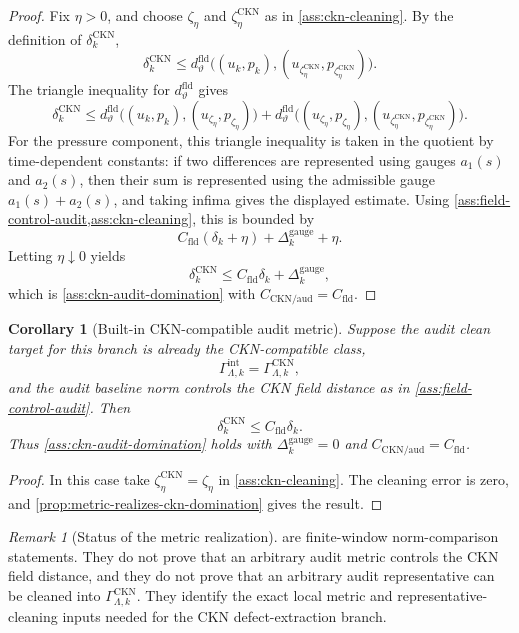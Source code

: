 \documentclass[11pt]{article}
\numberwithin{equation}{section}
\theoremstyle{plain}
\newtheorem{corollary}[theorem]{Corollary}
\theoremstyle{definition}
\theoremstyle{remark}
\newtheorem{remark}[theorem]{Remark}
\newcommand{\intg}{\mathrm{int}}
\begin{document}
\begin{proof}
Fix \(\eta>0\), and choose \(\zeta_\eta\) and
\(\zeta_\eta^{\mathrm{CKN}}\) as in \cref{ass:ckn-cleaning}.  By the
definition of \(\delta_k^{\mathrm{CKN}}\),
\[
  \delta_k^{\mathrm{CKN}}
  \le
  d_\vartheta^{\mathrm{fld}}
  \bigl((u_k,p_k),
  (u_{\zeta_\eta^{\mathrm{CKN}}},
  p_{\zeta_\eta^{\mathrm{CKN}}})\bigr).
\]
The triangle inequality for \(d_\vartheta^{\mathrm{fld}}\) gives
\[
  \delta_k^{\mathrm{CKN}}
  \le
  d_\vartheta^{\mathrm{fld}}
  \bigl((u_k,p_k),(u_{\zeta_\eta},p_{\zeta_\eta})\bigr)
  +
  d_\vartheta^{\mathrm{fld}}
  \bigl((u_{\zeta_\eta},p_{\zeta_\eta}),
  (u_{\zeta_\eta^{\mathrm{CKN}}},
  p_{\zeta_\eta^{\mathrm{CKN}}})\bigr).
\]
For the pressure component, this triangle inequality is taken in the quotient
by time-dependent constants: if two differences are represented using gauges
\(a_1(s)\) and \(a_2(s)\), then their sum is represented using the admissible
gauge \(a_1(s)+a_2(s)\), and taking infima gives the displayed estimate.
Using \cref{ass:field-control-audit,ass:ckn-cleaning}, this is bounded by
\[
  C_{\mathrm{fld}}(\delta_k+\eta)
  +
  \Delta_k^{\mathrm{gauge}}+\eta.
\]
Letting \(\eta\downarrow0\) yields
\[
  \delta_k^{\mathrm{CKN}}
  \le
  C_{\mathrm{fld}}\delta_k+\Delta_k^{\mathrm{gauge}},
\]
which is \cref{ass:ckn-audit-domination} with
\(C_{\mathrm{CKN/aud}}=C_{\mathrm{fld}}\).
\end{proof}

\begin{corollary}[Built-in CKN-compatible audit metric]
\label{cor:built-in-ckn-metric}
Suppose the audit clean target for this branch is already the
CKN-compatible class,
\[
  \Gamma_{\Lambda,k}^{\intg}=\Gamma_{\Lambda,k}^{\mathrm{CKN}},
\]
and the audit baseline norm controls the CKN field distance as in
\cref{ass:field-control-audit}.  Then
\[
  \delta_k^{\mathrm{CKN}}\le C_{\mathrm{fld}}\delta_k.
\]
Thus \cref{ass:ckn-audit-domination} holds with
\(\Delta_k^{\mathrm{gauge}}=0\) and
\(C_{\mathrm{CKN/aud}}=C_{\mathrm{fld}}\).
\end{corollary}

\begin{proof}
In this case take
\(\zeta_\eta^{\mathrm{CKN}}=\zeta_\eta\) in
\cref{ass:ckn-cleaning}.  The cleaning error is zero, and
\cref{prop:metric-realizes-ckn-domination} gives the result.
\end{proof}

\begin{remark}[Status of the metric realization]\label{rem:metric-realization-status}
 are
finite-window norm-comparison statements.  They do not prove that an arbitrary
audit metric controls the CKN field distance, and they do not prove that an
arbitrary audit representative can be cleaned into
\(\Gamma_{\Lambda,k}^{\mathrm{CKN}}\).  They identify the exact local metric
and representative-cleaning inputs needed for the CKN defect-extraction branch.
\end{remark}
\end{document}
